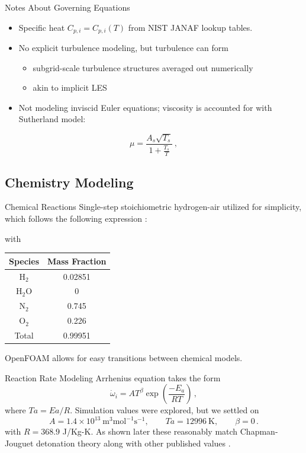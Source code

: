 \begin{frame}{Notes About Governing Equations}
\begin{itemize}
\item Specific heat $C_{p,i}=C_{p,i}(T)$ from NIST JANAF \cite{janaf} lookup tables.  
\item No explicit turbulence modeling, but turbulence can form
\begin{itemize}
    \item subgrid-scale turbulence structures averaged out numerically
    \item akin to implicit LES
\end{itemize}
\item Not modeling inviscid Euler equations; viscosity is accounted for with Sutherland \cite{sutherland} model:
\end{itemize}
\begin{equation}
\mu = \frac{A_s \sqrt{T_s}}{1 + \frac{T_s}{T}} \,,
\end{equation}
\end{frame}

\subsection{Chemistry Modeling}

\begin{frame}{Chemical Reactions}
Single-step stoichiometric hydrogen-air utilized for simplicity, which follows the following expression \cite{kuo}:
\begin{center}
\end{center}
with
\begin{table}[t!]
\centering
\begin{tabular}{cc}
Species & Mass Fraction \\ \hline
H\(_2\) & 0.02851 \\ 
H\(_2\)O & 0 \\
N\(_2\) & 0.745 \\ 
O\(_2\) & 0.226 \\ \hline
Total & 0.99951 \\ 
\end{tabular}
\end{table}
OpenFOAM allows for easy transitions between chemical models.
\end{frame}

\begin{frame}{Reaction Rate Modeling}
Arrhenius equation \cite{arrhenius} takes the form \cite{christ} 
\begin{equation}
\dot{\omega}_i = AT^\beta \exp\left(\frac{ -E_a}{R T}\right)\,,
\end{equation}
where $Ta = Ea/R$. Simulation values were explored, but we settled on 
\begin{equation}
   A = 1.4 \times 10^{13} ~ \text{m}^3\text{mol}^{-1}\text{s}^{-1},
   \qquad 
   Ta = 12996 ~\text{K},
   \qquad
   \beta = 0\,.
\end{equation}
with \(R = 368.9\) J/Kg-K. As shown later these reasonably match Chapman-Jouguet detonation theory \cite{chapman} along with other published values \cite{towery1,hashemi}.
\end{frame}

